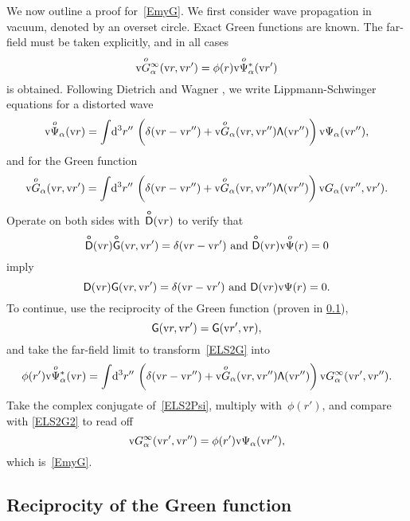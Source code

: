We now outline a proof for~\cref{EmyG}.
We first consider wave propagation in vacuum,
denoted by an overset circle.
Exact Green functions
are known.
The far-field must be taken explicitly,
and in all cases
\begin{equation}
  \vGo_\alpha^\infty(\r,\r') = \phi(r)\Psio_\alpha^*(\r')
\end{equation}
is obtained.
Following Dietrich and Wagner \cite{DiWa84,DiWa85,DiWa16},
we write Lippmann-Schwinger equations for a distorted wave
\begin{equation}\label{ELS2Psi}
   \Psio_\alpha(\r)
   = \int\!\d^3r''\, \left( \delta(\r-\r'') + \vGo_\alpha(\r,\r'')\TL(\r'') \right)
                     \v\Psi_\alpha(\r''),
\end{equation}
and for the Green function
\begin{equation}\label{ELS2G}
   \vGo_\alpha(\r,\r')
   = \int\!\d^3r''\, \left( \delta(\r-\r'') + \vGo_\alpha(\r,\r'')\TL(\r'') \right)
                     \v{G}_\alpha(\r'',\r').
\end{equation}
Operate on both sides with~$\mathsf{\overset{o}{D}}(\text{v}{r})$ to verify that
\begin{equation}
  \TDo(\r)\TGo(\r,\r') = \Td(\r-\r') \text{ and } \TDo(\r)\Psio(r)=0
\end{equation}
imply
\begin{equation}
  \mathsf{D}(\text{v}{r})\mathsf{G}(\text{v}{r},\text{v}{r}') = \mathsf{\delta}(\text{v}{r}-\text{v}{r}') \text{ and } \mathsf{D}(\text{v}{r})\text{v}\Psi(r)=0.
\end{equation}
To continue, use the reciprocity of the Green function (proven in \cref{SReci}),
\begin{equation}
  \mathsf{G}(\text{v}{r},\text{v}{r}') = \mathsf{G}(\text{v}{r}',\text{v}{r}),
\end{equation}
and take the far-field limit to transform~\cref{ELS2G} into
\begin{equation}\label{ELS2G2}
   \phi(r')\Psio_\alpha^*(\r)
   = \int\!\d^3r''\, \left( \delta(\r-\r'') + \vGo_\alpha(\r,\r'')\TL(\r'') \right)
                     \v{G}_\alpha^\infty(\r',\r'').
\end{equation}
Take the complex conjugate of~\cref{ELS2Psi},
multiply with~$\phi(r')$, and compare with \cref{ELS2G2}
to read off
\begin{equation}
   \text{v}{G}_\alpha^\infty(\text{v}{r}',\text{v}{r}'') = \phi(r')\text{v}\Psi_\alpha(\text{v}{r}''),
\end{equation}
which is~\cref{EmyG}.

\subsection{Reciprocity of the Green function}\label{SReci}

